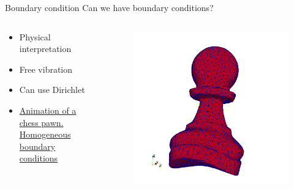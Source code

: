 \documentclass{beamer}[10pt]
\begin{document}
\begin{frame}{Boundary condition}
\centering
Can we have boundary conditions?
\vspace*{2em}
  \begin{columns}[T]
    \begin{column}{.5\textwidth}
    \begin{itemize}
    		\item {Physical interpretation}
		\item {Free vibration}
		\item {Can use Dirichlet}
		\item{
\href{http://www.youtube.com/watch?v=PGEh8rN9Qeo&feature=youtu.be}{Animation of a chess pawn. Homogeneous boundary conditions}
}
	\end{itemize}
    \end{column}
    \begin{column}{.5\textwidth}
    \begin{figure}
    \includegraphics[width=0.7\textwidth>]{PawnMode15.png}    
    \end{figure}
    \end{column}
  \end{columns}
\end{frame}
\end{document}
